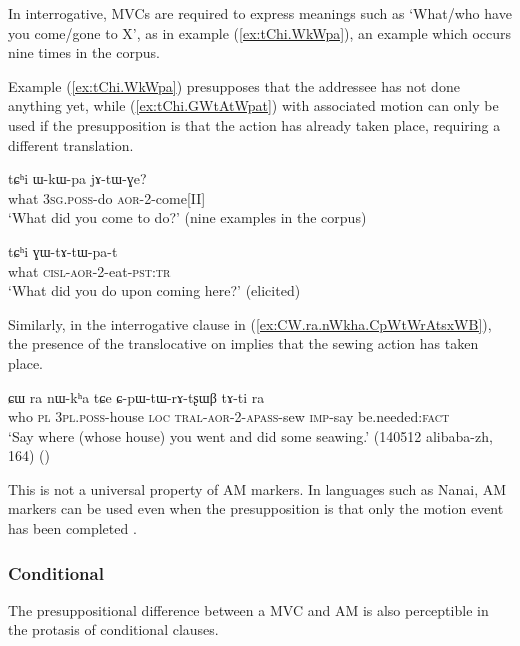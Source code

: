 In interrogative, MVCs are required to express meanings such as `What/who have you come/gone to X', as in example (\ref{ex:tChi.WkWpa}), an example which occurs nine times in the corpus.

Example (\ref{ex:tChi.WkWpa}) presupposes that the addressee has not done anything yet, while (\ref{ex:tChi.GWtAtWpat}) with associated motion can only be used if the presupposition is that the action has already taken place, requiring a different translation.

\begin{exe}
	\ex \label{ex:tChi.WkWpa}
	\gll tɕʰi ɯ-kɯ-pa jɤ-tɯ-ɣe? \\
	what \textsc{3sg}.\textsc{poss}-do \textsc{aor}-2-come[II] \\
	\glt `What did you come to do?' (nine examples in the corpus)
\end{exe}

\begin{exe}
\ex \label{ex:tChi.GWtAtWpat}
\gll tɕʰi ɣɯ-tɤ-tɯ-pa-t \\
what \textsc{cisl}-\textsc{aor}-2-eat-\textsc{pst}:\textsc{tr}    \\
\glt `What did you do upon coming here?' (elicited)
\end{exe}

Similarly, in the interrogative clause in (\ref{ex:CW.ra.nWkha.CpWtWrAtsxWB}), the presence of the translocative on  implies that the sewing action has taken place.

\begin{exe}
\ex \label{ex:CW.ra.nWkha.CpWtWrAtsxWB}
\gll ɕɯ ra nɯ-kʰa tɕe ɕ-pɯ-tɯ-rɤ-tʂɯβ tɤ-ti ra \\
who \textsc{pl} \textsc{3pl}.\textsc{poss}-house \textsc{loc} \textsc{tral}-\textsc{aor}-2-\textsc{apass}-sew \textsc{imp}-say be.needed:\textsc{fact} \\
\glt `Say where (whose house) you went and did some seawing.' (140512 alibaba-zh, 164) ()
\end{exe}

This is not a universal property of AM markers. In languages such as Nanai, AM markers can be used even when the presupposition is that only the motion event has been completed \citep{stojnova16nda}.

\subsubsection{Conditional} \label{sec:am.conditional}
The presuppositional difference between a MVC and AM is also perceptible in the protasis of conditional clauses. 

